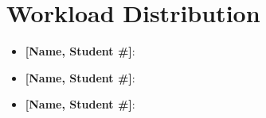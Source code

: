 \documentclass[11pt,letterpaper]{article}
\begin{document}
\section{Workload Distribution}


\begin{itemize}
  \item \textbf{[Name, Student \#]}: %
  \item \textbf{[Name, Student \#]}: %
  \item \textbf{[Name, Student \#]}: %
\end{itemize}
\end{document}
